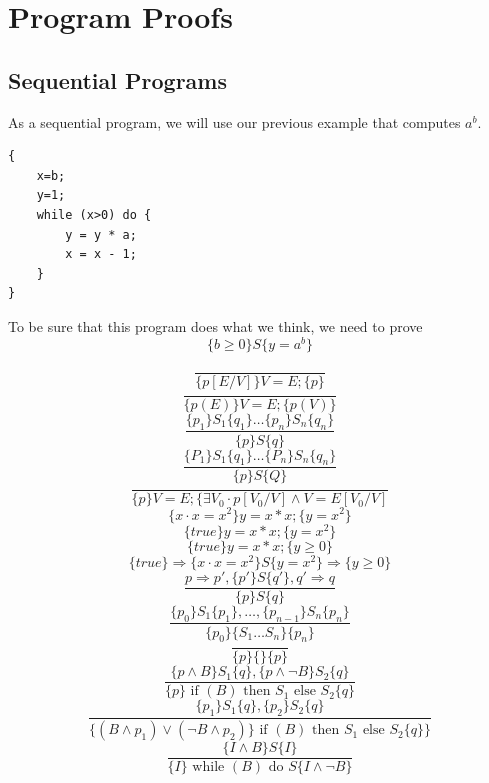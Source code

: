 \documentclass[12pt, a4paper]{book}
\begin{document}

  \chapter{Program Proofs}
  \label{chap:Program Proofs}

  \section{Sequential Programs}
  \label{sec:Sequential Programs}

As a sequential program, we will use our previous example that computes $a^b$.

\begin{lstlisting}[caption={Function computing $a^b$}, captionpos=below]
{
    x=b;
    y=1;
    while (x>0) do {
        y = y * a;
        x = x - 1;
    }
}
\end{lstlisting}

To be sure that this program does what we think, we need to prove
$$
\{ b \ge 0\} S \{ y = a^b \}
$$

$$
\frac{}
{\{ p[E/V] \} V=E; \{ p \} }
$$
$$
\frac{}
{ \{ p(E) \} V=E; \{ p(V) \} }
$$
$$
\frac
{ \{ p_1 \} S_1 \{ q_1 \} \ldots \{ p_n \} S_n \{ q_n \} }
{ \{ p \} S \{ q \} }
$$
$$
\frac
{ \{ P_1 \} S_1 \{ q_1 \} \ldots \{ P_n \} S_n \{ q_n \} }
{ \{ p \} S \{ Q \} }
$$
$$
\frac{}
{ \{ p \} V=E; \{ \exists V_0 \cdot p[ V_0 / V] \land V = E[V_0 / V] }
$$
$$
\{ x \cdot x = x^2 \} y = x*x; \{ y = x^2 \}
$$
$$
\{ true \} y = x*x; \{ y= x^2 \}
$$
$$
\{ true \} y = x*x; \{ y \ge 0 \}
$$
$$
\{ true \} \Rightarrow \{ x \cdot x = x^2 \} S \{ y = x^2 \} \Rightarrow \{ y \ge 0 \}
$$
$$
\frac
{ p \Rightarrow p', \{ p' \} S \{ q' \}, q' \Rightarrow q }
{ \{ p \} S \{ q \} }
$$
$$
\frac
{ \{ p_0 \} S_1 \{ p_1 \}, \ldots , \{ p_{n-1} \} S_n \{ p_n \} }
{ \{ p_0 \} \{ S_1 \ldots S_n \} \{ p_n \} }
$$
$$
\frac{}
{ \{ p \} \{ \} \{ p \} }
$$
$$
\frac
{ \{ p \land B \} S_1 \{ q \}, \{ p \land \lnot B \} S_2 \{ q \} }
{ \{ p \} \textrm{ if } (B) \textrm{ then } S_1 \textrm{ else } S_2 \{ q \} }
$$
$$
\frac
{ \{ p_1 \} S_1 \{ q \}, \{ p_2 \} S_2 \{ q \} }
{ \{ (B \land p_1 ) \lor (\lnot B \land p_2 ) \} \textrm{ if } (B) \textrm{ then } S_1 \textrm{ else } S_2 \{ q \} \} }
$$
$$
\frac
{ \{ I \land B \} S \{ I \} }
{ \{ I \} \textrm{ while } (B) \textrm{ do } S \{ I \land \lnot B \} }
$$
\end{document}
